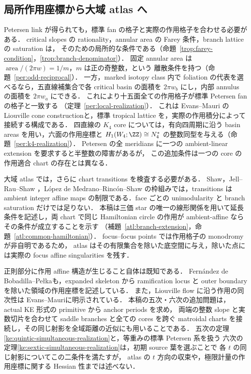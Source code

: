 \subsection{局所作用座標から大域 atlas へ}

Petersen link が得られても，標準 fan の格子と実際の作用格子を合わせる必要がある．
critical slopes の rationality，annular area の Farey 条件，branch lattice の saturation は，
そのための局所的な条件である（命題~\ref{trop:farey-condition}，\ref{trop:branch-denominator}）．
固定 annular area は $\operatorname{area}/(2\pi w)=1/m$，$m$ は正の奇整数，という
離散条件を持つ（命題~\ref{per:odd-reciprocal}）．
一方，marked isotopy class 内で foliation の代表を選べるなら，五直線補集合で各 critical
basin の面積を $2\pi w_b$ にし，内部 annulus の面積を $2\pi w_a$ にできる．
これにより十五面全ての作用格子が標準 Petersen fan の格子と一致する
（定理~\ref{per:local-realization}）．
これは Evans--Mauri の Liouville cone construction\cite{EM}と，標準 tropical lattice
\cite{GKM}を，実際の作用積分によって接続する構成である．
四直線の $K_4$ core については，有向四周期に沿う basin areas を用い，六面の作用座標と
$H_1(W_4;\ZZ)\cong N_4^*$ の整数同型を与える（命題~\ref{per:k4-realization}）．
Petersen の全 meridians に一つの ambient-linear extension を要求すると半整数の障害があるが，
この追加条件は一つの core の作用適合 chart の存在とは異なる．

大域 atlas では，さらに chart transitions を検査する必要がある．
Shaw\cite[Definition~3.1]{ShawSurfaces}，Jell--Rau--Shaw
\cite[Definitions~2.1, 3.1, 5.1]{JellRauShaw}，L\'opez de Medrano--Rinc\'on--Shaw
\cite[Definitions~2.2--2.4]{LRSChern}の枠組みでは，transitions は ambient integer affine maps
の制限である．face ごとの unimodularity と branch saturation だけでは足りない．
本稿は三価 star の唯一の線形関係を用いて延長条件を記述し，両 chart で同じ Hamiltonian
circle の作用が ambient-affine ならその条件が成立することを示す
（補題~\ref{atl:branch-extension}，命題~\ref{atl:common-hamiltonian}）．
focus--focus points では作用格子の monodromy が非自明である\cite[Remark~3.1]{VuNgoc}ため，
atlas はその有限集合を除いた底空間に与え，除いた点には実際の focus affine singularities を残す．

正則部分に作用 affine 構造が生じること自体は既知である．
Fernández de Bobadilla--Pełka\cite[Remark~5.9]{FBP}も，expanded skeleton から
ramification locus と outer boundary を除いた領域の作用座標を記述している．
また，Liouville flow に沿う作用の同次性は
Evans--Mauri\cite[Remarks~2.11--2.12]{EM}に明示されている．
本稿の五次・六次の追加問題は，actual KE 形式の primitive から anchor periods を求め，
両端の整数 slope と実数切片を合わせて saddle branches と全ての cores を跨ぐ
matroidal charts を接続し，その同じ射影を全域距離の近似にも用いることである．
五次の定理\ref{ke:quintic-simultaneous-realization}と，等重みの標準 Petersen 系を扱う
六次の定理\ref{ke:sextic-simultaneous-realization}は，初期 source 葉を選ぶことで
各 $t$ の同じ射影についてこの二条件を満たすが，
atlas の $t$ 方向の収束や，極限計量の作用座標に関する Hessian 性までは述べない．

